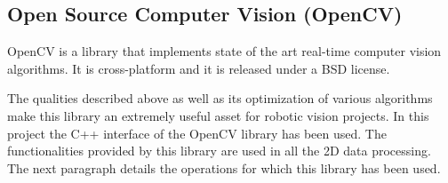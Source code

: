
			







	\subsection{Open Source Computer Vision (OpenCV)}
	\label{opencv}

	OpenCV \cite{opencv} is a library that implements state of the art real-time computer vision 
	algorithms. 
	It is cross-platform and it is released under a BSD \cite{BSD} license. 


	The qualities described above as well as its optimization of various algorithms make this library an extremely useful asset for robotic vision projects. 
	In this project the C++ interface of the OpenCV library has been used. 
	The functionalities provided by this library are used in all the 2D data processing. 
	The next paragraph details the operations for which this library has been used. 

